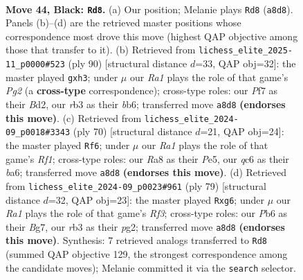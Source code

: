 \documentclass[11pt]{article}
\begin{document}
\clearpage

\begin{figure}[p]\centering
\begin{subfigure}{0.46\textwidth}\centering
\resizebox{\linewidth}{!}{%
\newchessgame
\chessboard[
  setfen={r7/5p1p/kpQ5/8/3P4/1R4PP/8/6K1 b - - 0 44},
  showmover=false,
  pgfstyle=straightmove, color=movearrow, markmove={a8-d8}
]}
\caption{}
\end{subfigure}\hfill
\begin{subfigure}{0.46\textwidth}\centering
\resizebox{\linewidth}{!}{%
\newchessgame
\chessboard[
  setfen={8/7k/1b3p2/p7/8/7q/P2B2PP/7K w - - 0 46},
  showmover=false,
  pgfstyle=straightmove, color=movearrow, markmove={g2-h3}
]}
\caption{}
\end{subfigure}
\\[4pt]
\begin{subfigure}{0.46\textwidth}\centering
\resizebox{\linewidth}{!}{%
\newchessgame
\chessboard[
  setfen={7k/p7/bp2n2p/4P3/4q3/P6P/6P1/5R1K w - - 4 36},
  showmover=false,
  pgfstyle=straightmove, color=movearrow, markmove={f1-f6}
]}
\caption{}
\end{subfigure}\hfill
\begin{subfigure}{0.46\textwidth}\centering
\resizebox{\linewidth}{!}{%
\newchessgame
\chessboard[
  setfen={8/2p3b1/4krP1/pp6/7Q/8/P1K3P1/8 b - - 0 40},
  showmover=false,
  pgfstyle=straightmove, color=movearrow, markmove={f6-g6}
]}
\caption{}
\end{subfigure}
\caption{\textbf{Move 44, Black: \texttt{Rd8}.} (a) Our position; Melanie plays \texttt{Rd8} (\texttt{a8d8}). Panels (b)--(d) are the retrieved master positions whose correspondence most drove this move (highest QAP objective among those that transfer to it). (b) Retrieved from \texttt{lichess\_elite\_2025-11\_p0000\#523} (ply 90) [structural distance $d$=33, QAP obj=32]: the master played \texttt{gxh3}; under $\mu$ our \emph{Ra1} plays the role of that game's \emph{Pg2} (a \textbf{cross-type} correspondence); cross-type roles: our \emph{P}f7 as their \emph{B}d2, our \emph{r}b3 as their \emph{b}b6; transferred move \texttt{a8d8} \textbf{(endorses this move)}. (c) Retrieved from \texttt{lichess\_elite\_2024-09\_p0018\#3343} (ply 70) [structural distance $d$=21, QAP obj=24]: the master played \texttt{Rf6}; under $\mu$ our \emph{Ra1} plays the role of that game's \emph{Rf1}; cross-type roles: our \emph{R}a8 as their \emph{P}e5, our \emph{q}c6 as their \emph{b}a6; transferred move \texttt{a8d8} \textbf{(endorses this move)}. (d) Retrieved from \texttt{lichess\_elite\_2024-09\_p0023\#961} (ply 79) [structural distance $d$=32, QAP obj=23]: the master played \texttt{Rxg6}; under $\mu$ our \emph{Ra1} plays the role of that game's \emph{Rf3}; cross-type roles: our \emph{P}b6 as their \emph{B}g7, our \emph{r}b3 as their \emph{p}g2; transferred move \texttt{a8d8} \textbf{(endorses this move)}. Synthesis: 7 retrieved analogs transferred to \texttt{Rd8} (summed QAP objective 129, the strongest correspondence among the candidate moves); Melanie committed it via the \texttt{search} selector.}
\label{fig:thought-m87}
\end{figure}
\end{document}
